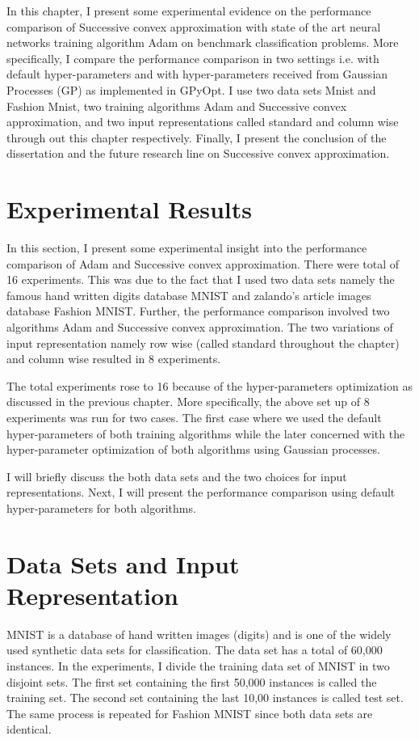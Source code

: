 In this chapter, I present some experimental evidence on the performance comparison of Successive convex approximation with state of the art neural networks training algorithm Adam on benchmark classification problems. More specifically, I compare the performance comparison in two settings i.e. with default hyper-parameters and with hyper-parameters received from Gaussian Processes (GP) as implemented in GPyOpt. I use two data sets Mnist and Fashion Mnist, two training algorithms Adam and Successive convex approximation, and two input representations called standard and column wise through out this chapter respectively. Finally, I present the conclusion of the dissertation and the future research line on Successive convex approximation. 

\section {Experimental Results}
 
In this section, I present some experimental insight into the performance comparison of Adam and Successive convex approximation. There were total of 16 experiments. This was due to the fact that I used two data sets namely the famous hand written digits database MNIST and zalando's article images database Fashion MNIST. Further, the performance comparison involved two algorithms Adam and Successive convex approximation. The two variations of input representation namely row wise (called standard throughout the chapter) and column wise resulted in 8 experiments. 

The total experiments rose to 16 because of the hyper-parameters optimization as discussed in the previous chapter. More specifically, the above set up of 8 experiments was run for two cases. The first case where we used the default hyper-parameters of both training algorithms while the later concerned with the hyper-parameter optimization of both algorithms using Gaussian processes.
 
I will briefly discuss the both data sets and the two choices for input representations. Next, I will present the performance comparison using default hyper-parameters for both algorithms.


\section {Data Sets and Input Representation}
 
MNIST is a database of hand written images (digits) and is one of the widely used synthetic data sets for classification. The data set has a total of 60,000 instances. In the experiments, I divide the training data set of MNIST in two disjoint sets. The first set containing the first 50,000 instances is called the training set. The second set containing the last 10,00 instances is called test set. The same process is repeated for Fashion MNIST since both data sets are identical. 

